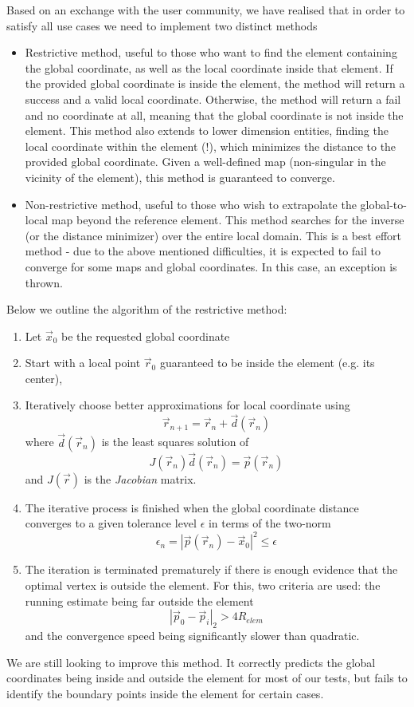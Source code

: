 \noindent
Based on an exchange with the \dune{} user community, we have realised that in order to satisfy all use cases we need to implement two distinct methods
\begin{itemize}
  \item Restrictive method, useful to those who want to find the element containing the global coordinate, as well as the local coordinate inside that element. If the provided global coordinate is inside the element, the method will return a success and a valid local coordinate. Otherwise, the method will return a fail and no coordinate at all, meaning that the global coordinate is not inside the element. This method also extends to lower dimension entities, finding the local coordinate within the element (!), which minimizes the distance to the provided global coordinate. Given a well-defined map (non-singular in the vicinity of the element), this method is guaranteed to converge.
  \item Non-restrictive method, useful to those who wish to extrapolate the global-to-local map beyond the reference element. This method searches for the inverse (or the distance minimizer) over the entire local domain. This is a best effort method - due to the above mentioned difficulties, it is expected to fail to converge for some maps and global coordinates. In this case, an exception is thrown.
\end{itemize}

\noindent
Below we outline the algorithm of the restrictive method:

\begin{mybox}
\begin{enumerate}
	\item Let $\vec{x}_0$ be the requested global coordinate
	\item Start with a local point $\vec{r}_0$ guaranteed to be inside the element (e.g. its center),
	\item Iteratively choose better approximations for local coordinate using \[\vec{r}_{n+1} = \vec{r}_n + \vec{d}(\vec{r}_n)\] where $\vec{d}(\vec{r}_n)$ is the least squares solution of
	        \[ J(\vec{r}_n) \vec{d}(\vec{r}_n) = \vec{p}(\vec{r}_n) \] and $J(\vec{r})$ is the \textit{Jacobian} matrix.
	\item The iterative process is finished when the global coordinate distance converges to a given tolerance level $\epsilon$ in terms of the two-norm
	        \[ \epsilon_n = |\vec{p}(\vec{r}_n) - \vec{x}_0 |^2 \leq \epsilon \]
	\item The iteration is terminated prematurely if there is enough evidence that the optimal vertex is outside the element. For this, two criteria are used: the running estimate being far outside the element \[|\vec{p}_0 - \vec{p}_i|_2 > 4 R_{elem}\] and the convergence speed being significantly slower than quadratic.
\end{enumerate}
\end{mybox}

\noindent
We are still looking to improve this method. It correctly predicts the global coordinates being inside and outside the element for most of our tests, but fails to identify the boundary points inside the element for certain cases.